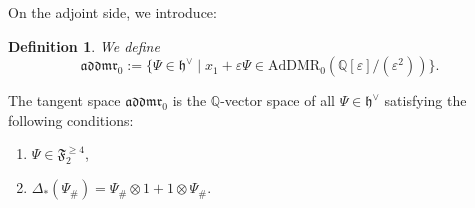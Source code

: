 \documentclass[15pt,oneside,reqno]{amsart}
\newcounter{dfcounter}
\newtheorem{df}{Definition}[dfcounter]
\theoremstyle{remark}{
\newtheorem{lem}[df]{Lemma}
\newtheorem{prop}[df]{Proposition}
\newtheorem{ex}[df]{Example}
\newtheorem{rmk}[df]{Remark}
}
\newcommand{\ide}[1]{\mathfrak{#1}}
\newcommand{\Q}{\mathbb{Q}}
\newcommand{\AdDMR}{\mathrm{AdDMR}}
\newcommand{\addmr}{\mathfrak{addmr}}
\begin{document}
On the adjoint side, we introduce:
\begin{df}\label{def:addmr}
We define
\[
\addmr_0 := \{\Psi \in  \ide{h}^{\vee} \mid x_1 + \varepsilon \Psi \in \AdDMR_0(\Q[\varepsilon]/(\varepsilon^2))\}.
\]
\end{df}


\begin{prop}\label{prop:addmr}
The tangent space $\addmr_0$ is the $\Q$-vector space of all $\Psi\in \ide{h}^{\vee}$ satisfying the following conditions:
\begin{enumerate}
\item\label{def:addmr--2} $\Psi \in \ide{F}_2^{\ge 4}$,
\item\label{def:addmr--3} $\Delta_{*}(\Psi_{\#}) = \Psi_{\#} \otimes 1 + 1 \otimes \Psi_{\#}$.
\end{enumerate}
\end{prop}
\end{document}
